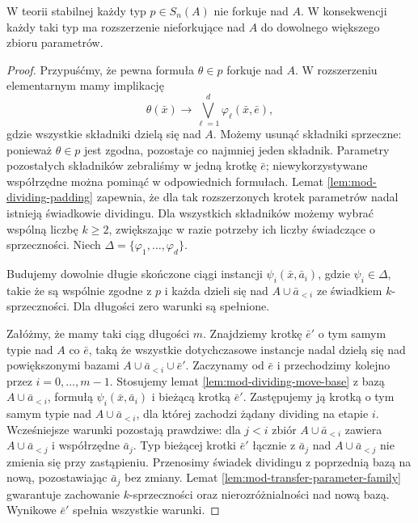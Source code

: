 \begin{twierdzenie}
\label{thm:mod-stable-extension-base}
W teorii stabilnej każdy typ $p\in S_n(A)$
nie forkuje nad $A$. W konsekwencji każdy taki
typ ma rozszerzenie nieforkujące nad $A$
do dowolnego większego zbioru parametrów.
\end{twierdzenie}
\begin{proof}
Przypuśćmy, że pewna formuła $\theta\in p$
forkuje nad $A$. W rozszerzeniu elementarnym
mamy implikację
\[
\theta(\bar x)\to
\bigvee_{\ell=1}^{d}\varphi_\ell(\bar x,\bar e),
\]
gdzie wszystkie składniki dzielą się nad $A$.
Możemy usunąć składniki sprzeczne: ponieważ
$\theta\in p$ jest zgodna, pozostaje co najmniej
jeden składnik. Parametry pozostałych składników
zebraliśmy w jedną
krotkę $\bar e$; niewykorzystywane współrzędne
można pominąć w odpowiednich formułach.
Lemat \ref{lem:mod-dividing-padding}
zapewnia, że dla tak rozszerzonych krotek
parametrów nadal istnieją świadkowie dividingu.
Dla wszystkich składników możemy wybrać
wspólną liczbę $k\geq2$, zwiększając
w razie potrzeby ich liczby świadczące
o sprzeczności.
Niech $\Delta=\{\varphi_1,\ldots,\varphi_d\}$.

Budujemy dowolnie długie skończone ciągi
instancji $\psi_i(\bar x,\bar a_i)$,
gdzie $\psi_i\in\Delta$, takie że
są wspólnie zgodne z $p$ i każda dzieli się
nad $A\cup\bar a_{<i}$ ze świadkiem
$k$-sprzeczności.
Dla długości zero warunki są spełnione.

Załóżmy, że mamy taki ciąg długości $m$.
Znajdziemy krotkę $\bar e'$ o tym samym
typie nad $A$ co $\bar e$, taką że wszystkie
dotychczasowe instancje nadal dzielą się
nad powiększonymi bazami
$A\cup\bar a_{<i}\cup\bar e'$.
Zaczynamy od $\bar e$ i przechodzimy
kolejno przez $i=0,\ldots,m-1$.
Stosujemy lemat \ref{lem:mod-dividing-move-base}
z bazą $A\cup\bar a_{<i}$, formułą
$\psi_i(\bar x,\bar a_i)$ i bieżącą krotką
$\bar e'$.
Zastępujemy ją krotką o tym samym typie
nad $A\cup\bar a_{<i}$, dla której zachodzi
żądany dividing na etapie $i$.
Wcześniejsze warunki pozostają prawdziwe:
dla $j<i$ zbiór $A\cup\bar a_{<i}$ zawiera
$A\cup\bar a_{<j}$ i współrzędne $\bar a_j$.
Typ bieżącej krotki $\bar e'$ łącznie
z $\bar a_j$ nad $A\cup\bar a_{<j}$
nie zmienia się przy zastąpieniu.
Przenosimy świadek dividingu z poprzednią bazą
na nową, pozostawiając $\bar a_j$ bez zmiany.
Lemat \ref{lem:mod-transfer-parameter-family}
gwarantuje zachowanie $k$-sprzeczności
oraz nierozróżnialności nad nową bazą.
Wynikowe $\bar e'$ spełnia wszystkie
warunki.


\end{proof}
